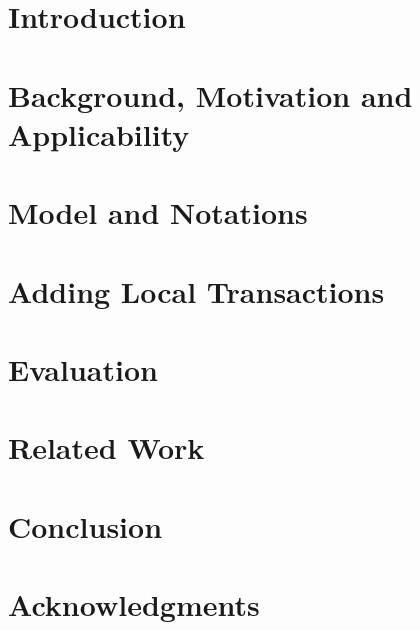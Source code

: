 \documentclass{vldb}
\newcommand\MyIncludeGraphics[2][]{%
    \IfFileExists{#2}{%
        \texttt{[image: \#2]}%
    }{%
        \missingfigure[figwidth=2.0cm]{}%
    }%
}%
\begin{document}
\maketitle

\sloppy


\begin{abstract}

\end{abstract}


\section{Introduction} \label{sec:intro}

\section{Background, Motivation and Applicability}%
\label{sec:background}

\section{Model and Notations}

\section{Adding Local Transactions}

\section{Evaluation}

\section{Related Work}

\section{Conclusion}

\ifblind
\else
\section{Acknowledgments}
\end{document}
